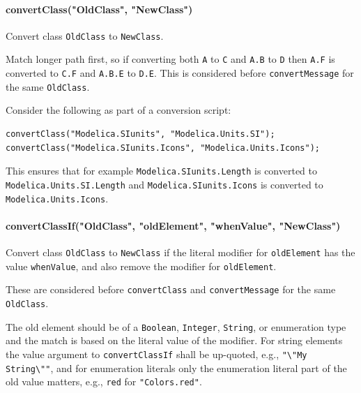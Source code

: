 \paragraph*{convertClass("OldClass", "NewClass")}\label{convertclassoldclassnewclass}

Convert class \lstinline!OldClass! to \lstinline!NewClass!.

Match longer path first, so if converting both \lstinline!A! to \lstinline!C! and \lstinline!A.B! to \lstinline!D! then \lstinline!A.F! is converted to \lstinline!C.F! and \lstinline!A.B.E! to \lstinline!D.E!.
This is considered before \lstinline!convertMessage! for the same \lstinline!OldClass!.

\begin{example}
Consider the following as part of a conversion script:
\begin{lstlisting}[language=modelica]
convertClass("Modelica.SIunits", "Modelica.Units.SI");
convertClass("Modelica.SIunits.Icons", "Modelica.Units.Icons");
\end{lstlisting}
This ensures that for example \lstinline!Modelica.SIunits.Length! is converted to \lstinline!Modelica.Units.SI.Length! and \lstinline!Modelica.SIunits.Icons! is converted to \lstinline!Modelica.Units.Icons!.
\end{example}

\paragraph*{convertClassIf("OldClass", "oldElement", "whenValue", "NewClass")}\label{convertclassifoldclass-oldelement-whenvalue-newclass}

Convert class \lstinline!OldClass! to \lstinline!NewClass! if the literal modifier for \lstinline!oldElement! has the value \lstinline!whenValue!, and also remove the modifier for \lstinline!oldElement!.

These are considered before \lstinline!convertClass! and \lstinline!convertMessage! for the same \lstinline!OldClass!.

The old element should be of a \lstinline!Boolean!, \lstinline!Integer!, \lstinline!String!, or enumeration type and the match is based on the literal value of the modifier.
For string elements the value argument to \lstinline!convertClassIf! shall be up-quoted, e.g., \lstinline!"\"My String\""!, and for enumeration literals only the enumeration literal part of the old value matters, e.g., \lstinline!red! for \lstinline!"Colors.red"!.

